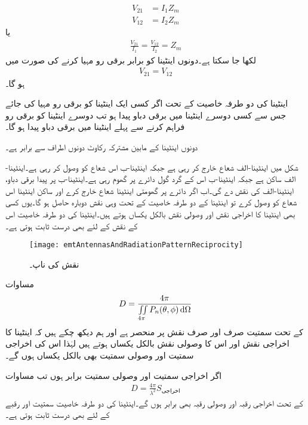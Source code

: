 \begin{align*}
V_{21}&=I_1 Z_m\\
V_{12}&=I_2 Z_m
\end{align*}
یا
\begin{align}
\frac{V_{21}}{I_1}=\frac{V_{12}}{I_2}=Z_m
\end{align}
لکھا جا سکتا ہے۔دونوں اینٹینا کو  برابر برقی رو  مہیا کرنے کی صورت میں
\begin{align}
V_{21}=V_{12}
\end{align}
ہو گا۔

اینٹینا کی دو طرفہ خاصیت کے تحت اگر کسی ایک اینٹینا کو برقی رو  مہیا کی جائے جس سے کسی دوسرے اینٹینا میں برقی دباو  پیدا ہو تب دوسرے اینٹینا کو برقی رو  فراہم کرنے سے پہلے اینٹینا میں برقی دباو  پیدا ہو گا۔

دونوں اینٹینا کے مابین مشترکہ رکاوٹ  دونوں اطراف سے برابر ہے۔

شکل  میں اینٹینا-الف شعاع خارج کر رہی ہے جبکہ اینٹینا-ب اس شعاع کو وصول کر رہی ہے۔اینٹینا-الف ساکن ہے جبکہ اینٹینا-ب اس کے گرد گول دائرے پر گھوم رہی ہے۔اینٹینا-ب پر پیدا برقی دباو، اینٹینا-الف کی نقش دے گی۔اب اگر دائرے پر گھومتی اینٹینا شعاع خارج کرے اور ساکن اینٹینا اس شعاع کو وصول کرے تو اینٹینا کے دو طرفہ خاصیت کے تحت وہی نقش دوبارہ حاصل ہو گا۔یوں کسی بھی اینٹینا کا اخراجی نقش اور وصولی نقش بالکل یکساں ہوتے ہیں۔اینٹینا کی دو طرفہ خاصیت اس کے نقش کے لئے بھی درست ثابت ہوتی ہے۔
\begin{figure}
\centering
\texttt{[image: emtAntennasAndRadiationPatternReciprocity]}
\caption{نقش کی ناپ۔}
\label{شکل_اینٹینا_نقش_ناپ}
\end{figure}
مساوات 
\begin{align}
D=\frac{4\pi}{\iint \limits_{4\pi} P_n(\theta,\phi) \dif \Omega}
\end{align}
کے تحت سمتیت صرف اور صرف نقش پر منحصر ہے اور ہم دیکھ چکے ہیں کہ اینٹینا کا اخراجی نقش اور اس کا وصولی نقش بالکل یکساں ہوتے ہیں لہٰذا اس کی اخراجی سمتیت اور وصولی سمتیت بھی بالکل یکساں ہوں گے۔

اگر اخراجی سمتیت اور  وصولی سمتیت برابر ہوں تب مساوات 
\begin{align}
D=\frac{4\pi}{\lambda^2} S_{\text{اخراجی}}
\end{align}
کے تحت اخراجی رقبہ اور وصولی رقبہ بھی برابر ہوں گے۔اینٹینا کی دو طرفہ خاصیت سمتیت اور رقبے کے لئے بھی درست ثابت ہوتی ہے۔

